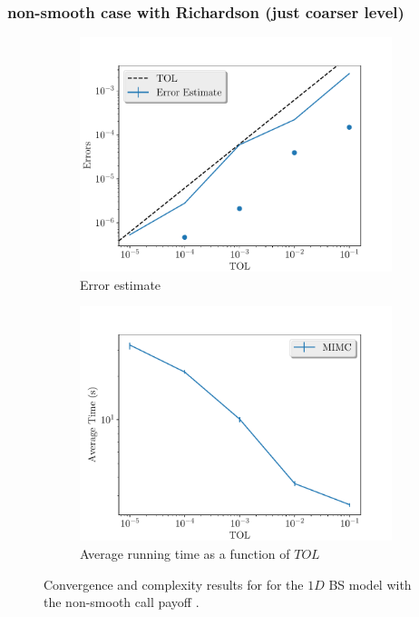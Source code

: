 \documentclass[11pt]{article}
\begin{document}
\subsubsection*{non-smooth case with Richardson (just coarser level)}


\begin{figure}[!h]
	\centering
	\begin{subfigure}{.5\textwidth}
		\centering
		\includegraphics[width=1\linewidth]{./figures/1D_BS_4_steps_non_smooth_richardson_coarser/error_estimate.pdf}
		\caption{Error estimate}
		\label{fig:misc_1D_BS_non_smooth_4steps_sub1}
	\end{subfigure}%
	\begin{subfigure}{.5\textwidth}
		\centering
		\includegraphics[width=1\linewidth]{./figures/1D_BS_4_steps_non_smooth_richardson_coarser/average_running_time.pdf}
		\caption{Average running time as a function of $TOL$}
		\label{fig:misc_1D_BS_non_smooth_4steps_sub2}
	\end{subfigure}%
	\caption{Convergence and complexity results for for the $1D$ BS model with the non-smooth call payoff .}
	\label{fig:misc_1D_BS_nonsmooth_4steps_2}
\end{figure}
\end{document}
